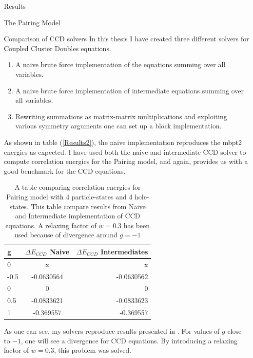 \documentclass[twoside,english]{uiofysmaster}
\begin{document}
\begin{chapter}{Results}
\begin{section}{The Pairing Model}
		\begin{subsection}{Comparison of CCD solvers}
			In this thesis I have created three different solvers for Coupled Cluster Doubles equations. 
			\begin{enumerate}
				\item A naive brute force implementation of the equations summing over all variables. 
				\item A naive brute force implementation of intermediate equations summing over all variables.
				\item Rewriting summations as matrix-matrix multiplications and exploiting various symmetry arguments one can set up a block implementation.
			\end{enumerate}		
			As shown in table (\ref{Results2}), the naive implementation reproduces the mbpt2 energies as expected. I have used both the naive and intermediate CCD solver to compute correlation energies for the Pairing model, and again, \cite{Hjorth-Jensen2016} provides us with a good benchmark for the CCD equations.

			\begin{table}[H]
				\begin{center}
					\begin{tabular}[center]{l | c | r}
						g & $ \Delta E_{CCD}$ Naive  & $\Delta E_{CCD}$ Intermediates \\
						\hline
						0 & x & x \\
						-0.5 & -0.0630564 & -0.0630562 \\
						0 & 0 & 0 \\
						0.5 & -0.0833621 & -0.0833623 \\
						1 & -0.369557 & -0.369557
					\end{tabular}
				\end{center}
				\caption{A table comparing correlation energies for Pairing model with 4 particle-states and 4 hole-states. This table compare results from Naive and Intermediate implementation of CCD equations. A relaxing factor of $w = 0.3$ has been used because of divergence around $g=-1$}
				\label{Results3}
			\end{table}
			As one can see, my solvers reproduce results presented in \cite{Hjorth-Jensen2016}. For values of $g$ close to $-1$, one will see a divergence for CCD equations. By introducing a relaxing factor of $w = 0.3$, this problem was solved. 
  

\end{subsection}
\end{section}
\end{chapter}
\end{document}
